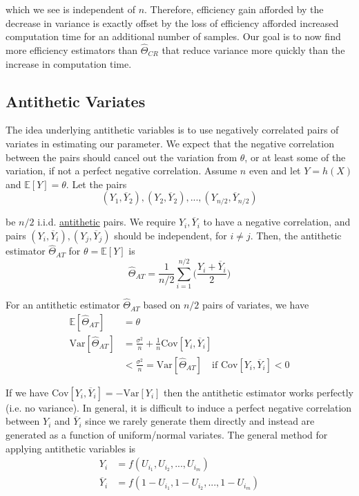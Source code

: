 \documentclass[12pt]{article}
\newenvironment{theorem}[2][Theorem:]{\begin{trivlist} %
\item[\hskip \labelsep {\bfseries #1}\hskip \labelsep {\bfseries #2.}]}{\end{trivlist}}
\newlength\tindent
\renewcommand{\indent}{\hspace*{\tindent}}
\begin{document}
which we see is independent of $n$. Therefore, efficiency gain afforded by the decrease in variance is exactly offset by the loss of efficiency afforded increased computation time for an additional number of samples. Our goal is to now find more efficiency estimators than $\hat{\Theta}_{CR}$ that reduce variance more quickly than the increase in computation time.

\subsection{Antithetic Variates}

\indent The idea underlying antithetic variables is to use negatively correlated pairs of variates in estimating our parameter. We expect that the negative correlation between the pairs should cancel out the variation from $\theta$, or at least some of the variation, if not a perfect negative correlation. Assume $n$ even and let $Y = h(X)$ and $\mathbb E[Y] = \theta$. Let the pairs
\begin{equation*}
	(Y_1, \overline{Y}_2), (Y_2, \overline{Y}_2), ... , (Y_{n/2}, \overline{Y}_{n/2})
\end{equation*}

be $n/2$ i.i.d. \underline{antithetic} pairs. We require $Y_i, \overline{Y}_i$ to have a negative correlation, and pairs $(Y_i, \overline{Y}_i), (Y_j, \overline{Y}_j)$ should be independent, for $i \neq j$. Then, the antithetic estimator $\hat{\Theta}_{AT}$ for $\theta = \mathbb E[Y]$ is
\begin{equation*}
	\hat{\Theta}_{AT} = \frac{1}{n/2} \sum^{n/2}_{i=1} \bigg(\frac{Y_i + \overline{Y}_i}{2}\bigg)
\end{equation*} 

\begin{theorem}{Some results for antithetic estimators} For an antithetic estimator $\hat{\Theta}_{AT}$ based on $n/2$ pairs of variates, we have
\begin{align*}
	\mathbb E[\hat{\Theta}_{AT}] &= \theta \\
	\mathrm{Var}[\hat{\Theta}_{AT}] &= \frac{\sigma^2}{n} + \frac{1}{n}\mathrm{Cov}[Y_i, \overline{Y}_i] \\
	&< \frac{\sigma^2}{n} = \mathrm{Var}[\hat{\Theta}_{AT}] \quad \text{if } \mathrm{Cov}[Y_i, \overline{Y}_i] < 0
\end{align*}
\end{theorem}

\indent If we have $\mathrm{Cov}[Y_i, \overline{Y}_i] = -\mathrm{Var}[Y_i]$ then the antithetic estimator works perfectly (i.e. no variance). In general, it is difficult to induce a perfect negative correlation between $Y_i$ and $\overline{Y}_i$ since we rarely generate them directly and instead are generated as a function of uniform/normal variates. The general method for applying antithetic variables is
\begin{align*}
	Y_i &= f(U_{i_1}, U_{i_2}, ..., U_{i_m}) \\
	\overline{Y}_i &= f(1 - U_{i_1}, 1 - U_{i_2}, ..., 1 - U_{i_m})
\end{align*}
\end{document}
